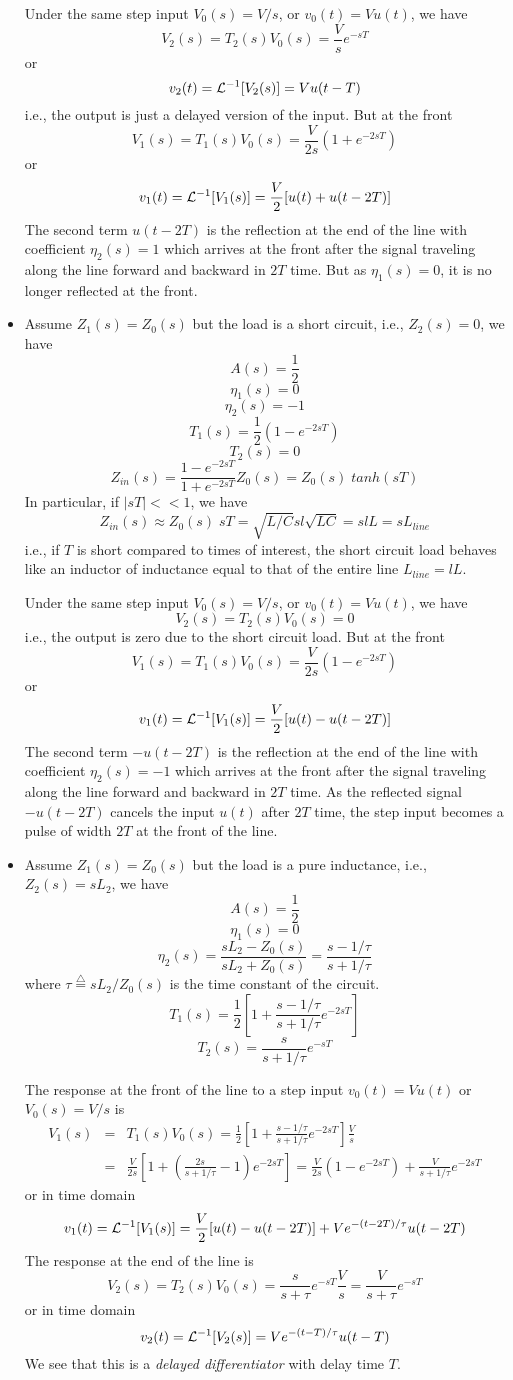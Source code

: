 \begin{itemize}
Under the same step input $V_0(s)=V/s$, or $v_0(t)=Vu(t)$, we have
\[	V_2(s)=T_2(s)V_0(s)=\frac{V}{s}e^{-sT}	\]
or
\[	v_2(t)={\cal L}^{-1}[V_2(s)]=Vu(t-T)	\]
i.e., the output is just a delayed version of the input. But at the
front
\[	V_1(s)=T_1(s)V_0(s)=\frac{V}{2s}(1+e^{-2sT})	\]
or
\[	v_1(t)={\cal L}^{-1}[V_1(s)]=\frac{V}{2}[u(t)+u(t-2T)]	\]
The second term $u(t-2T)$ is the reflection at the end of the line
with coefficient $\eta_2(s)=1$ which arrives at the front after
the signal traveling along the line forward and backward in $2T$ time.
But as $\eta_1(s)=0$, it is no longer reflected at the front.

\item Assume $Z_1(s)=Z_0(s)$ but the load is a short circuit, i.e., 
$Z_2(s)=0$, we have
\[	A(s)=\frac{1}{2} \]
\[	\eta_1(s)=0	\]
\[	\eta_2(s)=-1	\]
\[	T_1(s)=\frac{1}{2}(1-e^{-2sT})	\]
\[	T_2(s)=0	\]
\[ Z_{in}(s)=\frac{1-e^{-2sT}}{1+e^{-2sT}}Z_0(s)=Z_0(s)\;tanh(sT) \]
In particular, if $|sT| << 1$, we have
\[ Z_{in}(s)\approx Z_0(s) \;sT=\sqrt{L/C}sl\sqrt{LC}
	=slL=sL_{line}	\]
i.e., if $T$ is short compared to times of interest, the short
circuit load behaves like an inductor of inductance equal to that of 
the entire line $L_{line}=lL$.

Under the same step input $V_0(s)=V/s$, or $v_0(t)=Vu(t)$, we have
\[	V_2(s)=T_2(s)V_0(s)=0	\]
i.e., the output is zero due to the short circuit load. But at the
front
\[	V_1(s)=T_1(s)V_0(s)=\frac{V}{2s}(1-e^{-2sT})	\]
or
\[	v_1(t)={\cal L}^{-1}[V_1(s)]=\frac{V}{2}[u(t)-u(t-2T)]	\]
The second term $-u(t-2T)$ is the reflection at the end of the line
with coefficient $\eta_2(s)=-1$ which arrives at the front after
the signal traveling along the line forward and backward in $2T$ time.
As the reflected signal $-u(t-2T)$ cancels the input $u(t)$ after $2T$
time, the step input becomes a pulse of width $2T$ at the front of
the line.

\item Assume $Z_1(s)=Z_0(s)$ but the load is a pure inductance, i.e.,
$Z_2(s)=sL_2$, we have
\[	A(s)=\frac{1}{2} \]
\[	\eta_1(s)=0	\]
\[	\eta_2(s)=\frac{sL_2-Z_0(s)}{sL_2+Z_0(s)}
	=\frac{s-1/\tau}{s+1/\tau} \]
where $\tau\stackrel{\triangle}{=}sL_2/Z_0(s)$ is the time constant of the
circuit. 
\[	T_1(s)=\frac{1}{2}[1+\frac{s-1/\tau}{s+1/\tau} e^{-2sT}] \]
\[	T_2(s)=\frac{s}{s+1/\tau}e^{-sT} \]

The response at the front of the line to a step input 
$v_0(t)=Vu(t)$ or $V_0(s)=V/s$ is
\begin{eqnarray}
V_1(s) & = & T_1(s)V_0(s)
	=\frac{1}{2}[1+\frac{s-1/\tau}{s+1/\tau}e^{-2sT}]\frac{V}{s}
	\nonumber \\
 & = & \frac{V}{2s}[1+(\frac{2s}{s+1/\tau}-1)e^{-2sT}]
  =\frac{V}{2s}(1-e^{-2sT})+\frac{V}{s+1/\tau}e^{-2sT}
	\nonumber 
\end{eqnarray}
or in time domain
\[	v_1(t)={\cal L}^{-1}[V_1(s)]=\frac{V}{2}[u(t)-u(t-2T)]+Ve^{-(t-2T)/\tau}u(t-2T) \]
The response at the end of the line is
\[ 	V_2(s)=T_2(s)V_0(s)=\frac{s}{s+\tau}e^{-sT} \frac{V}{s}
	=\frac{V}{s+\tau}e^{-sT} \]
or in time domain
\[	v_2(t)={\cal L}^{-1}[V_2(s)]=Ve^{-(t-T)/\tau}u(t-T)	\]
We see that this is a {\em delayed differentiator} with delay time $T$. 


\end{itemize}
